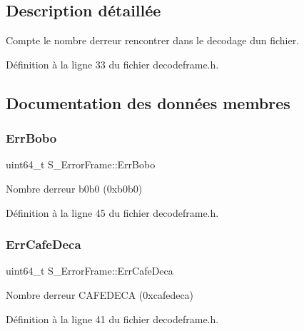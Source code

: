 \subsection{Description détaillée}
Compte le nombre d\textquotesingle{}erreur rencontrer dans le decodage d\textquotesingle{}un fichier. 

Définition à la ligne 33 du fichier decodeframe.\+h.



\subsection{Documentation des données membres}
\mbox{\label{struct_s___error_frame_a7340625c1dbd480af74d8af9a368430b}} 
\subsubsection{\texorpdfstring{Err\+Bobo}{ErrBobo}}
{\footnotesize\ttfamily uint64\+\_\+t S\+\_\+\+Error\+Frame\+::\+Err\+Bobo}



Nombre d\textquotesingle{}erreur b0b0 (0xb0b0) 



Définition à la ligne 45 du fichier decodeframe.\+h.

\mbox{\label{struct_s___error_frame_afd8c552c6ca758eb5aedb35a4a7ae611}} 
\subsubsection{\texorpdfstring{Err\+Cafe\+Deca}{ErrCafeDeca}}
{\footnotesize\ttfamily uint64\+\_\+t S\+\_\+\+Error\+Frame\+::\+Err\+Cafe\+Deca}



Nombre d\textquotesingle{}erreur C\+A\+F\+E\+D\+E\+CA (0xcafedeca) 



Définition à la ligne 41 du fichier decodeframe.\+h.

\mbox{\label{struct_s___error_frame_a7b70f13f1ca7e67689d74352af21b69d}} 

